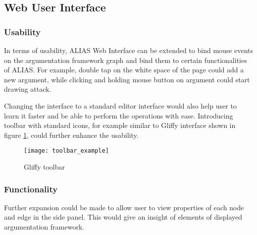 \subsection{Web User Interface}

\subsubsection{Usability}
In terms of usability, ALIAS Web Interface can be extended to bind mouse events on the argumentation framework graph and bind them to certain functionalities of ALIAS. For example, double tap on the white space of the page could add a new argument, while clicking and holding mouse button on argument could start drawing attack. 

Changing the interface to a standard editor interface would also help user to learn it faster and be able to perform the operations with ease. Introducing toolbar with standard icons, for example similar to Gliffy interface shown in figure \ref{fig:toolbarExample}, could further enhance the usability.

\begin{figure}
	\texttt{[image: toolbar\_example]}
	\caption{Gliffy toolbar}
	\label{fig:toolbarExample}
\end{figure}

\subsubsection{Functionality}
Further expansion could be made to allow user to view properties of each node and edge in the side panel. This would give an insight of elements of displayed argumentation framework. 